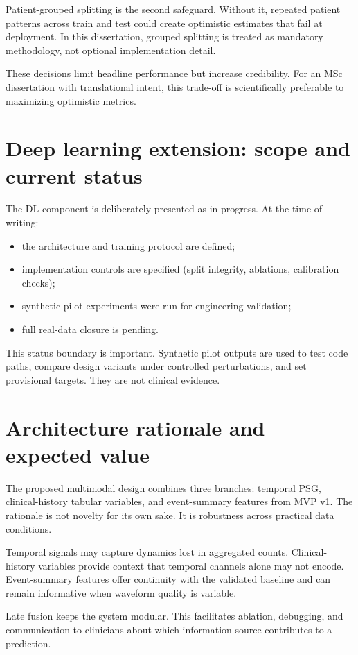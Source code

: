 Patient-grouped splitting is the second safeguard. Without it, repeated patient patterns across train and test could create optimistic estimates that fail at deployment. In this dissertation, grouped splitting is treated as mandatory methodology, not optional implementation detail.

These decisions limit headline performance but increase credibility. For an MSc dissertation with translational intent, this trade-off is scientifically preferable to maximizing optimistic metrics.

\section{Deep learning extension: scope and current status}
The DL component is deliberately presented as in progress. At the time of writing:
\begin{itemize}[leftmargin=1.2cm]
    \item the architecture and training protocol are defined;
    \item implementation controls are specified (split integrity, ablations, calibration checks);
    \item synthetic pilot experiments were run for engineering validation;
    \item full real-data closure is pending.
\end{itemize}

This status boundary is important. Synthetic pilot outputs are used to test code paths, compare design variants under controlled perturbations, and set provisional targets. They are not clinical evidence.

\section{Architecture rationale and expected value}
The proposed multimodal design combines three branches: temporal PSG, clinical-history tabular variables, and event-summary features from MVP v1. The rationale is not novelty for its own sake. It is robustness across practical data conditions.

Temporal signals may capture dynamics lost in aggregated counts. Clinical-history variables provide context that temporal channels alone may not encode. Event-summary features offer continuity with the validated baseline and can remain informative when waveform quality is variable.

Late fusion keeps the system modular. This facilitates ablation, debugging, and communication to clinicians about which information source contributes to a prediction.

